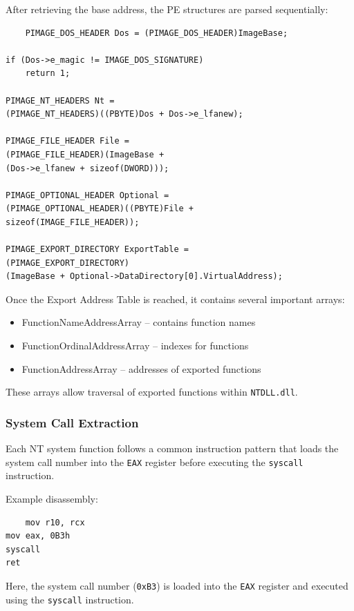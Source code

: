     



After retrieving the base address, the PE structures are parsed sequentially:

\begin{lstlisting}
    PIMAGE_DOS_HEADER Dos = (PIMAGE_DOS_HEADER)ImageBase;

if (Dos->e_magic != IMAGE_DOS_SIGNATURE)
    return 1;

PIMAGE_NT_HEADERS Nt =
(PIMAGE_NT_HEADERS)((PBYTE)Dos + Dos->e_lfanew);

PIMAGE_FILE_HEADER File =
(PIMAGE_FILE_HEADER)(ImageBase +
(Dos->e_lfanew + sizeof(DWORD)));

PIMAGE_OPTIONAL_HEADER Optional =
(PIMAGE_OPTIONAL_HEADER)((PBYTE)File +
sizeof(IMAGE_FILE_HEADER));

PIMAGE_EXPORT_DIRECTORY ExportTable =
(PIMAGE_EXPORT_DIRECTORY)
(ImageBase + Optional->DataDirectory[0].VirtualAddress);
\end{lstlisting}



Once the Export Address Table is reached, it contains several important arrays:

\begin{itemize}
\item FunctionNameAddressArray – contains function names
\item FunctionOrdinalAddressArray – indexes for functions
\item FunctionAddressArray – addresses of exported functions
\end{itemize}

These arrays allow traversal of exported functions within \texttt{NTDLL.dll}.

\subsubsection{System Call Extraction}

Each NT system function follows a common instruction pattern that loads the system call 
number into the \texttt{EAX} register before executing the \texttt{syscall} instruction.

Example disassembly:

\begin{lstlisting}
    mov r10, rcx
mov eax, 0B3h
syscall
ret
\end{lstlisting}



Here, the system call number (\texttt{0xB3}) is loaded into the \texttt{EAX} register and 
executed using the \texttt{syscall} instruction.

